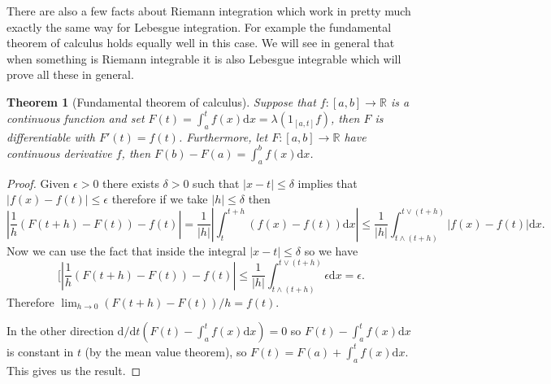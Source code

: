 \documentclass[11pt]{article}
\newtheorem{thm}{Theorem}[section]
\theoremstyle{definition}
\theoremstyle{remark}
\begin{document}
There are also a few facts about Riemann integration which work in pretty much exactly the same way for Lebesgue integration. For example the fundamental theorem of calculus holds equally well in this case. We will see in general that when something is Riemann integrable it is also Lebesgue integrable which will prove all these in general.
\begin{thm}[Fundamental theorem of calculus]
Suppose that $f: [a,b] \rightarrow \mathbb{R}$ is a continuous function and set $F(t) = \int_a^t f(x) \mathrm{d}x = \lambda( 1_{[a,t]} f)$, then $F$ is differentiable with $F'(t) = f(t)$. Furthermore, let $F: [a,b] \rightarrow \mathbb{R}$ have continuous derivative $f$, then $F(b) - F(a) = \int_a^b f(x) \mathrm{d}x$. 
\end{thm}
\begin{proof}
Given $\epsilon >0$ there exists $\delta >0$ such that $|x-t| \leq \delta$ implies that $|f(x) -f(t)| \leq \epsilon$ therefore if we take $|h| \leq \delta$ then 
\[\left| \frac{1}{h}(F(t+h) - F(t)) - f(t)\right| = \frac{1}{|h|} \left|\int_t^{t+h}(f(x) - f(t)) \mathrm{d}x\right| \leq \frac{1}{|h|} \int_{t \wedge (t+h)}^{t \vee (t+h)} |f(x) - f(t)| \mathrm{d}x. \] Now we can use the fact that inside the integral $|x-t| \leq \delta$ so we have
\[ [\left| \frac{1}{h}(F(t+h) - F(t)) - f(t)\right| \leq \frac{1}{|h|} \int_{t \wedge (t+h)}^{t \vee (t+h)} \epsilon \mathrm{d}x = \epsilon. \] Therefore $\lim_{h \rightarrow 0} (F(t+h)-F(t))/h = f(t)$. 

In the other direction $\mathrm{d}/\mathrm{d}t(F(t) - \int_a^t f(x) \mathrm{d}x) = 0$ so $F(t) - \int_a^t f(x) \mathrm{d}x$ is constant in $t$ (by the mean value theorem), so $F(t) = F(a) + \int_a^t f(x) \mathrm{d}x$. This gives us the result.
\end{proof}
\end{document}
